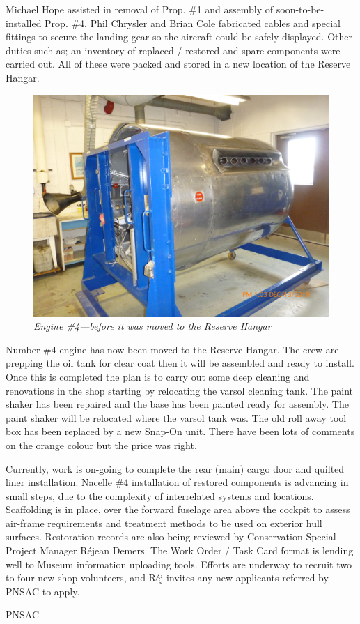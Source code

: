 Michael Hope
assisted in removal of Prop. \#1 and assembly of soon-to-be-installed
Prop. \#4. Phil Chrysler and Brian Cole fabricated cables and special
fittings to secure the landing gear so the aircraft could be safely
displayed. Other duties  such as; an inventory of replaced / restored
and spare components were carried out.  All of these were packed and
stored in a new location of the Reserve Hangar.

\begin{figure}[httb]
   \vspace{2em}
   \centering
   \includegraphics [scale=0.5]{eng-4-pre-move-feb-2020.png}
   \caption*{\small \em Engine \#4---before it was moved to the Reserve Hangar}
   \label{fig:wall-two}
\end{figure}

Number \#4 engine has now  been moved to the Reserve Hangar. The crew
are prepping the oil tank for clear coat then it will be assembled and
ready to install. Once this is completed  the plan is to carry out some
deep cleaning and renovations in the shop starting  by  relocating the
varsol cleaning tank. The paint shaker has been repaired and the base
has been painted ready for assembly. The paint shaker will be relocated
where the varsol tank was. The old roll away tool box has been replaced
by a new Snap-On unit. There have been lots of comments on the orange
colour  but the price was right.

Currently, work is on-going to complete the rear (main) cargo door and
quilted liner installation. Nacelle \#4 installation of restored
components is advancing in small steps, due to the complexity of
interrelated systems and locations. Scaffolding is in place, over the
forward fuselage area above the cockpit to assess air-frame
requirements and treatment methods to be used on exterior hull
surfaces. Restoration records are also being reviewed by Conservation
Special Project Manager R\'{e}jean Demers. The Work Order / Task Card
format is lending well to Museum information uploading tools. Efforts
are underway to recruit two to four new shop volunteers, and R\'{e}j
invites any new applicants referred by PNSAC to apply.

\begin{footnotesize}
  \raggedleft PNSAC\\
\end{footnotesize}



